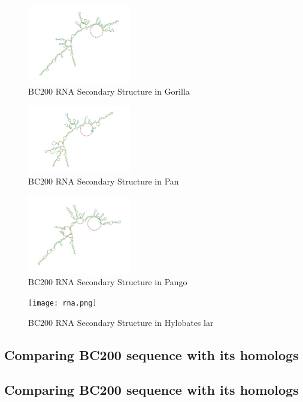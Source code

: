 \documentclass[conference]{IEEEtran}
\begin{document}
\begin{figure}
  \centering
  \includegraphics[width=0.4\textwidth]{figs/rnagorilla.png}
  \caption{BC200 RNA Secondary Structure in Gorilla}
\end{figure}
\begin{figure}
  \centering
  \includegraphics[width=0.4\textwidth]{figs/rnapan.png}
  \caption{BC200 RNA Secondary Structure in Pan}
\end{figure}
\begin{figure}
  \centering
  \includegraphics[width=0.4\textwidth]{figs/rnapango.png}
  \caption{BC200 RNA Secondary Structure in Pango}
\end{figure}

\begin{figure}
  \centering
  \texttt{[image: rna.png]}
  \caption{BC200 RNA Secondary Structure in Hylobates lar}
\end{figure}
\subsection{Comparing BC200 sequence with its homologs}


\subsection{Comparing BC200 sequence with its homologs}
\end{document}

